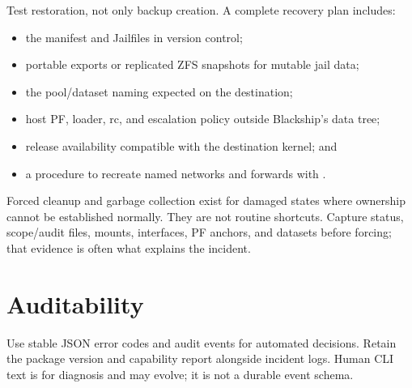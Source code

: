Test restoration, not only backup creation. A complete recovery plan includes:

\begin{itemize}
  \item the manifest and Jailfiles in version control;
  \item portable exports or replicated ZFS snapshots for mutable jail data;
  \item the pool/dataset naming expected on the destination;
  \item host PF, loader, rc, and escalation policy outside Blackship's data tree;
  \item release availability compatible with the destination kernel; and
  \item a procedure to recreate named networks and forwards with
    .
\end{itemize}

\begin{shipwarning}
Forced cleanup and garbage collection exist for damaged states where ownership
cannot be established normally. They are not routine shortcuts. Capture status,
scope/audit files, mounts, interfaces, PF anchors, and datasets before forcing;
that evidence is often what explains the incident.
\end{shipwarning}

\section{Auditability}

Use stable JSON error codes and audit events for automated decisions. Retain
the package version and capability report alongside incident logs. Human CLI
text is for diagnosis and may evolve; it is not a durable event schema.
